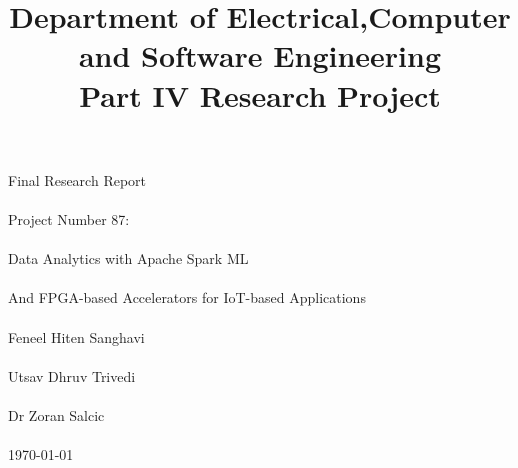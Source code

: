 

\title{Department of Electrical,Computer and Software Engineering \\ Part IV Research Project}







\maketitle




\begin{center}
Final Research Report \\~\\
Project Number 87:  \\~\\
Data Analytics with Apache Spark ML\\~\\ 
And FPGA-based Accelerators for IoT-based Applications\\~\\ 
Feneel Hiten Sanghavi\\~\\
Utsav Dhruv Trivedi  \\~\\ 
Dr Zoran Salcic \\~\\

\today

\end{center}



\maketitle

\newpage

